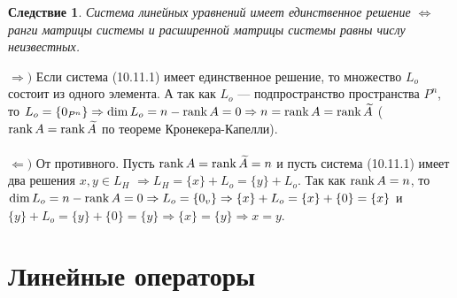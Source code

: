 \newtheorem*{cor10_11}{Следствие}\begin{cor10_11}Система линейных уравнений имеет единственное решение $\Longleftrightarrow$ ранги матрицы системы и расширенной матрицы системы равны числу неизвестных.
\end{cor10_11}\begin{Proof}
	$\Rightarrow)$ Если система (10.11.1) имеет единственное решение, то множество $L_o$ состоит из одного элемента. А так как $L_o$ --- подпространство пространства $P^n$, то $L_o = \{0_{P^n}\} \Rightarrow \dim L_o = n-\operatorname{rank} A = 0\Rightarrow n= \operatorname{rank} A = \operatorname{rank}  \widetilde{A}$ ($\operatorname{rank} A = \operatorname{rank} \widetilde{A}$ по теореме Кронекера-Капелли).\\\\
	$\Leftarrow )$ От противного. Пусть $\operatorname{rank} A = \operatorname{rank} \widetilde{A} = n$ и пусть система (10.11.1) имеет два решения $x,y \in L_H$ $\Rightarrow L_H = \{ x\} + L_o = \{ y\} + L_o$.
	Так как $\operatorname{rank} A = n$, то $\dim  L_o = n-\operatorname{rank} A = 0\Rightarrow L_o =\{ 0_v \}\Rightarrow \{x\} + L_o = \{x\} + \{0\} = \{x\}$ и $\{y\} + L_o = \{y\} + \{0\} = \{y\}\Rightarrow \{x\} = \{y\} \Rightarrow x = y$.
\end{Proof}	





\chapter{Линейные операторы}
